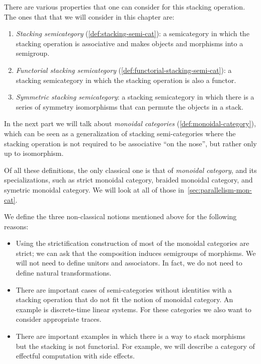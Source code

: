 There are various properties that one can consider for this stacking operation.
The ones that that we will consider in this chapter are:
%
\begin{enumerate}
    \item \emph{Stacking semicategory} (\cref{def:stacking-semi-cat}): a semicategory in which the stacking operation is associative and makes objects and morphisms into a semigroup.
    \item \emph{Functorial stacking semicategory} (\cref{def:functorial-stacking-semi-cat}): a stacking semicategory in which the stacking operation is also a functor.
    \item \emph{Symmetric stacking semicategory}: a stacking semicategory in which there is a series of symmetry isomorphisms that can permute the objects in a stack.
\end{enumerate}
%
In the next part we will talk about \emph{monoidal categories} (\cref{def:monoidal-category}), which can be seen as a generalization of stacking semi-categories where the stacking operation is not required to be associative ``on the nose'', but rather only up to isomorphism.

\begin{remark}
    Of all these definitions, the only classical one is that of \emph{monoidal category}, and its specializations, such as strict monoidal category, braided monoidal category, and symetric monoidal category.
    We will look at all of those in~\cref{sec:parallelism-mon-cat}.

    We define the three non-classical notions mentioned above for the following reasons:
    \begin{itemize}
        \item Using the strictification construction of \SetL most of the monoidal categories are strict; we can ask that the composition induces semigroups of morphisms.
              We will not need to define unitors and associators.
              In fact, we do not need to define natural transformations.
        \item There are important cases of semi-categories without identities with a stacking operation that do not fit the notion of monoidal category.
              An example is discrete-time linear systems.
              For these categories we also want to consider appropriate traces.
        \item There are important examples in which there is a way to stack morphisms but the stacking is not functorial.
              For example, we will describe a category of effectful computation with side effects.
    \end{itemize}
\end{remark}


